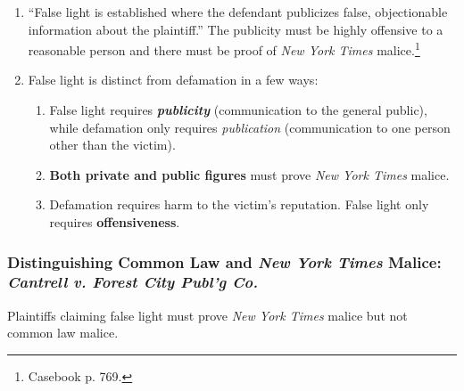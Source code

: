 \begin{enumerate}
    \item ``False light is established where the defendant publicizes false, 
    objectionable information about the plaintiff.'' The publicity must be 
    highly offensive to a reasonable person and there must be proof of 
    \emph{New York Times} malice.\footnote{Casebook p. 769.}
    \item False light is distinct from defamation in a few ways:
    \begin{enumerate}
        \item False light requires \textbf{\emph{publicity}} (communication to 
        the general public), while defamation only requires \emph{publication} 
        (communication to one person other than the victim).
        \item \textbf{Both private and public figures} must prove \emph{New 
        York Times} malice.
        \item Defamation requires harm to the victim's reputation. False 
        light only requires \textbf{offensiveness}.
    \end{enumerate}
\end{enumerate}

\subsubsection{Distinguishing Common Law and \emph{New York Times} Malice: 
\emph{Cantrell v. Forest City Publ'g Co.}}

Plaintiffs claiming false light must prove \emph{New York Times} malice but 
not common law malice.

